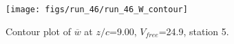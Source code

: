 \begin{figure}[H]
\centering
\texttt{[image: figs/run\_46/run\_46\_W\_contour]}
\caption{Contour plot of $\overline{w}$ at $z/c$=9.00, $V_{free}$=24.9, station 5.}
\label{fig:run_46_W_contour}
\end{figure}


